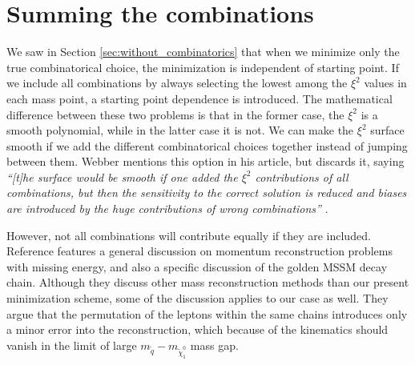 \documentclass[twoside,english]{uiofysmaster}
\begin{document}
\section{Summing the combinations}
\label{sec:combinatorics-sum_all_contributions}
We saw in Section \ref{sec:without_combinatorics} that when we minimize only the true combinatorical choice, the minimization is independent of starting point. If we include all combinations by always selecting the lowest among the $\xi^2$ values in each mass point, a starting point dependence is introduced. The mathematical difference between these two problems is that in the former case, the $\xi^2$ is a smooth polynomial, while in the latter case it is not. We can make the $\xi^2$ surface smooth if we add the different combinatorical choices together instead of jumping between them. Webber mentions this option in his article, but discards it, saying {\it ``[t]he surface would be smooth if one added the $\xi^2$ contributions of all combinations,  but then the sensitivity to the correct solution is reduced and biases are introduced by the huge contributions of wrong combinations''} \cite{Webber:2009vm}. 

However, not all combinations will contribute equally if they are included. Reference \cite{Gripaios:2011jm} features a general discussion on momentum reconstruction problems with missing energy, and also a specific discussion of the golden MSSM decay chain. Although they discuss other mass reconstruction methods than our present minimization scheme, some of the discussion applies to our case as well. They argue that the permutation of the leptons within the same chains introduces only a minor error into the reconstruction, which because of the kinematics should vanish in the limit of large $m_{\tilde q}-m_{\tilde \chi_1^0}$ mass gap.
\end{document}
